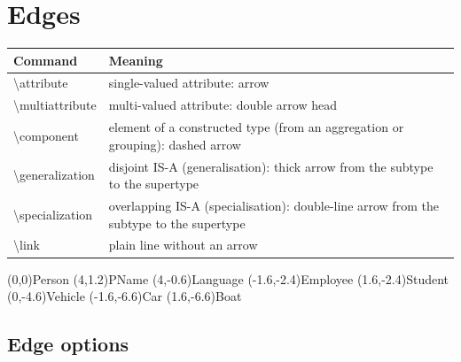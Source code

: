 \documentclass[10pt,a4paper]{article}
\begin{document}
\section{Edges}

\begin{longtable}{@{}>{\ttfamily}p{5cm}p{10.8cm}@{}}
\toprule
\normalfont\textbf{Command} & \textbf{Meaning}\\\midrule
\textbackslash attribute & single-valued attribute: arrow\\
\textbackslash multiattribute & multi-valued attribute: double arrow head\\
\textbackslash component & element of a constructed type (from an
  aggregation or grouping): dashed arrow\\
\textbackslash generalization & disjoint IS-A (generalisation): thick
  arrow from the subtype to the supertype\\
\textbackslash specialization & overlapping IS-A (specialisation):
  double-line arrow from the subtype to the supertype\\
\textbackslash link & plain line without an arrow\\
\bottomrule
\end{longtable}

\begin{example}
\begin{gsmdiagram}
  (0,0){Person}
  (4,1.2){PName}
  (4,-0.6){Language}
  (-1.6,-2.4){Employee}
  (1.6,-2.4){Student}
  (0,-4.6){Vehicle}
  (-1.6,-6.6){Car}
  (1.6,-6.6){Boat}
\end{gsmdiagram}
\end{example}

\subsection{Edge options}
\end{document}
